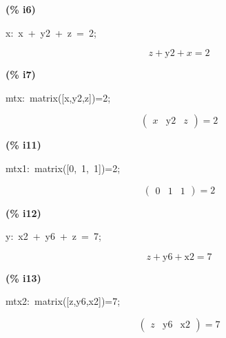 \documentclass[fleqn]{article}
\begin{document}
\noindent
\begin{minipage}[t]{4.000000em}\color{red}\bfseries
(\% i6)	
\end{minipage}
\begin{minipage}[t]{\textwidth}\color{blue}
x:\ x\ +\ y2\ +\ z\ =\ 2;
\end{minipage}
\[\displaystyle \tag{mtx} 
z\mathop{+}\ensuremath{\mathrm{y2}}\mathop{+}x\mathop{=}2\mbox{}
\]


\noindent
\begin{minipage}[t]{4.000000em}\color{red}\bfseries
(\% i7)	
\end{minipage}
\begin{minipage}[t]{\textwidth}\color{blue}
mtx:\ matrix([x,y2,z])=2;
\end{minipage}
\[\displaystyle \tag{mtx} 
\begin{pmatrix}x & \ensuremath{\mathrm{y2}} & z\end{pmatrix}\mathop{=}2\mbox{}
\]


\noindent
\begin{minipage}[t]{4.000000em}\color{red}\bfseries
(\% i11)	
\end{minipage}
\begin{minipage}[t]{\textwidth}\color{blue}
mtx1:\ matrix([0,\ 1,\ 1])=2;
\end{minipage}
\[\displaystyle \tag{mtx1} 
\begin{pmatrix}0 & 1 & 1\end{pmatrix}\mathop{=}2\mbox{}
\]


\noindent
\begin{minipage}[t]{4.000000em}\color{red}\bfseries
(\% i12)	
\end{minipage}
\begin{minipage}[t]{\textwidth}\color{blue}
y:\ x2\ +\ y6\ +\ z\ =\ 7;
\end{minipage}
\[\displaystyle \tag{y} 
z\mathop{+}\ensuremath{\mathrm{y6}}\mathop{+}\ensuremath{\mathrm{x2}}\mathop{=}7\mbox{}
\]


\noindent
\begin{minipage}[t]{4.000000em}\color{red}\bfseries
(\% i13)	
\end{minipage}
\begin{minipage}[t]{\textwidth}\color{blue}
mtx2:\ matrix([z,y6,x2])=7;
\end{minipage}
\[\displaystyle \tag{mtx2} 
\begin{pmatrix}z & \ensuremath{\mathrm{y6}} & \ensuremath{\mathrm{x2}}\end{pmatrix}\mathop{=}7\mbox{}
\]
\end{document}
